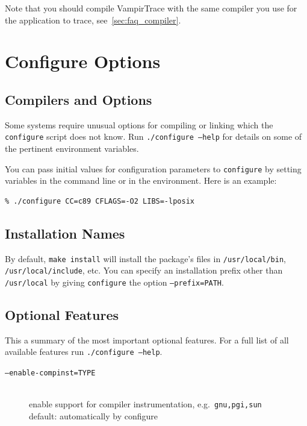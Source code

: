\documentclass[a4paper,twoside,12pt,BCOR12mm]{scrbook}
\newcommand{\pathname}[1]{\nolinkurl{#1}}  %
\renewcommand{\pathname}[1]{\texttt{#1}}   %
\begin{document}
\begin{latexonly}
    Note that you should compile VampirTrace with the same compiler you use for the
    application to trace, see~\ref{sec:faq_compiler}.


\section{Configure Options}
\label{sec:configure}
\subsection*{Compilers and Options}


      Some systems require unusual options for compiling or linking which
      the\latex{\linebreak} \texttt{configure} script does not know.  Run \texttt{./configure --help}
      for details on some of the pertinent environment variables.

      You can pass initial values for configuration parameters to \texttt{configure}
      by setting variables in the command line or in the environment.  Here
      is an example:

\begin{verbatim}
% ./configure CC=c89 CFLAGS=-O2 LIBS=-lposix
\end{verbatim} 

\subsection*{Installation Names}

      By default, \texttt{make install} will install the package's files in
      \pathname{/usr/local/bin}, \pathname{/usr/local/include}, etc.  You can specify an
      installation prefix other than \pathname{/usr/local} by giving \texttt{configure} the
      option \texttt{--prefix=PATH}.


\subsection*{Optional Features}

      This a summary of the most important optional features. For a full list of all available 
      features run \texttt{./configure --help}.

\begin{description}
\item[\texttt{--enable-compinst=TYPE}] ~\\
                              enable support for compiler instrumentation,
                              e.g.~\texttt{gnu,pgi,sun}\\
                              default: automatically by configure


\end{description}
\end{latexonly}
\end{document}
